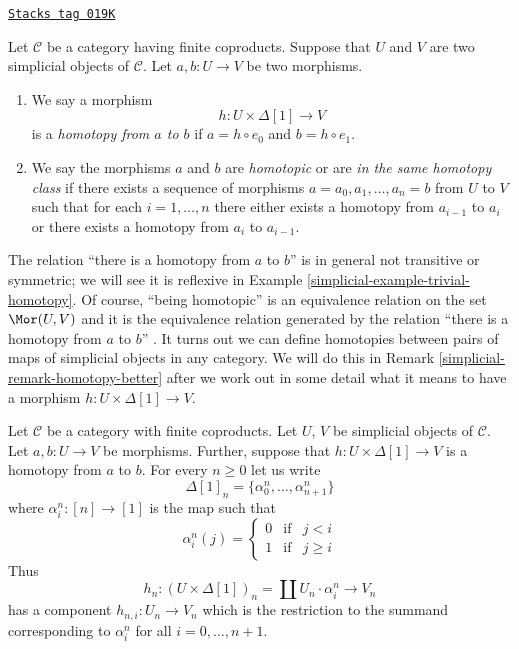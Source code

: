 \begin{definition}[Homotopy]
\label{simplicial-definition-homotopy}
\href{https://stacks.math.columbia.edu/tag/019K}{\texttt{Stacks tag 019K}}

Let $\mathcal{C}$ be a category having finite coproducts.
Suppose that $U$ and $V$ are two simplicial objects of $\mathcal{C}$.
Let $a, b : U \to V$ be two morphisms.
\begin{enumerate}
\item We say a morphism
$$
h : U \times \Delta[1] \longrightarrow V
$$
is a {\it homotopy from $a$ to $b$} if $a = h \circ e_0$ and
$b = h \circ e_1$.
\item We say the morphisms $a$ and $b$ are {\it homotopic} or are
{\it in the same homotopy class}
if there exists a sequence of morphisms $a = a_0, a_1, \ldots, a_n = b$
from $U$ to $V$ such that for each $i = 1, \ldots, n$ there either exists
a homotopy from $a_{i - 1}$ to $a_i$ or there exists a homotopy
from $a_i$ to $a_{i - 1}$.
\end{enumerate}
\end{definition}

The relation ``there is a homotopy from $a$ to $b$'' is in general not
transitive or symmetric; we will see it is reflexive in
Example \ref{simplicial-example-trivial-homotopy}. Of course, ``being homotopic''
is an equivalence relation on the set $\Mor(U, V)$ and it is the
equivalence relation generated by the relation
``there is a homotopy from $a$ to $b$'' .
It turns out we can define homotopies between pairs of maps of simplicial
objects in any category. We will do this in Remark \ref{simplicial-remark-homotopy-better}
after we work out in some detail what it means to have a morphism
$h : U \times \Delta[1] \to V$.

\medskip\noindent
Let $\mathcal{C}$ be a category with finite coproducts.
Let $U$, $V$ be simplicial objects of $\mathcal{C}$.
Let $a, b : U \to V$ be morphisms. Further, suppose
that $h : U \times \Delta[1] \to V$ is a homotopy
from $a$ to $b$. For every $n \geq 0$
let us write
$$
\Delta[1]_n = \{\alpha^n_0, \ldots, \alpha^n_{n + 1}\}
$$
where $\alpha^n_i : [n] \to [1]$ is the map
such that
$$
\alpha^n_i(j)
=
\left\{
\begin{matrix}
0 & \text{if} & j < i\\
1 & \text{if} & j \geq i
\end{matrix}
\right.
$$
Thus
$$
h_n : (U \times \Delta[1])_n = \coprod U_n \cdot \alpha^n_i
\longrightarrow
V_n
$$
has a component $h_{n, i} : U_n \to V_n$ which is the restriction
to the summand corresponding to $\alpha^n_i$ for all $i = 0, \ldots, n + 1$.


